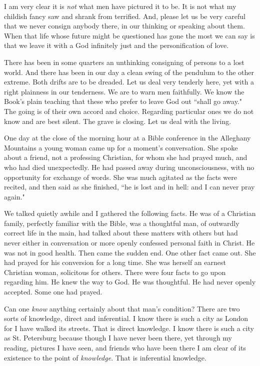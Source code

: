 I am very clear it is \textit{not} what men have pictured it to be. It is not
what my childish fancy saw and shrank from terrified. And, please let us
be very careful that we never consign anybody there, in our thinking or
speaking about them. When that life whose future might be questioned has
gone the most we can say is that we leave it with a God infinitely just
and the personification of love.

There has been in some quarters an unthinking consigning of persons to a
lost world. And there has been in our day a clean swing of the pendulum
to the other extreme. Both drifts are to be dreaded. Let us deal very
tenderly here, yet with a right plainness in our tenderness. We are to
warn men faithfully. We know the Book's plain teaching that these who
prefer to leave God out ``shall go away." The going is of their own accord
and choice. Regarding particular ones we do not know and are best silent.
The grave is closing. Let us deal with the living.

One day at the close of the morning hour at a Bible conference in the
Alleghany Mountains a young woman came up for a moment's conversation. She
spoke about a friend, not a professing Christian, for whom she had prayed
much, and who had died unexpectedly. He had passed away during
unconsciousness, with no opportunity for exchange of words. She was much
agitated as the facts were recited, and then said as she finished, ``he is
lost and in hell: and I can never pray again."

We talked quietly awhile and I gathered the following facts. He was of a
Christian family, perfectly familiar with the Bible, was a thoughtful man,
of outwardly correct life in the main, had talked about these matters with
others but had never either in conversation or more openly confessed
personal faith in Christ. He was not in good health. Then came the sudden
end. One other fact came out. She had prayed for his conversion for a long
time. She was herself an earnest Christian woman, solicitous for others.
There were four facts to go upon regarding him. He knew the way to God. He
was thoughtful. He had never openly accepted. Some one had prayed.

Can one \textit{know} anything certainly about that man's condition? There are
two sorts of knowledge, direct and inferential. I know there is such a
city as London for I have walked its streets. That is direct knowledge. I
know there is such a city as St. Petersburg because though I have never
been there, yet through my reading, pictures I have seen, and friends who
have been there I am clear of its existence to the point of \textit{knowledge}.
That is inferential knowledge.

